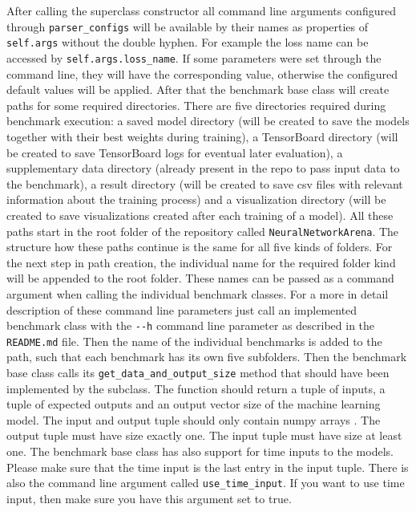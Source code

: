 \documentclass[draft,final]{vutinfth} %
\begin{document}
    After calling the superclass constructor all command line arguments configured through \texttt{parser\_configs} will be available by their names as properties of \texttt{self.args} without the double hyphen.
    For example the loss name can be accessed by \texttt{self.args.loss\_name}.
    If some parameters were set through the command line, they will have the corresponding value, otherwise the configured default values will be applied.
    After that the benchmark base class will create paths for some required directories. 
    There are five directories required during benchmark execution: a saved model directory (will be created to save the models together with their best weights during training), a TensorBoard directory (will be created to save TensorBoard logs for eventual later evaluation), a supplementary data directory (already present in the repo to pass input data to the benchmark), a result directory (will be created to save csv files with relevant information about the training process) and a visualization directory (will be created to save visualizations created after each training of a model).
    All these paths start in the root folder of the repository called \texttt{NeuralNetworkArena}. 
    The structure how these paths continue is the same for all five kinds of folders.
    For the next step in path creation, the individual name for the required folder kind will be appended to the root folder.
    These names can be passed as a command argument when calling the individual benchmark classes. 
    For a more in detail description of these command line parameters just call an implemented benchmark class with the \texttt{-{}-h} command line parameter as described in the \texttt{README.md} file.
    Then the name of the individual benchmarks is added to the path, such that each benchmark has its own five subfolders.
    Then the benchmark base class calls its \texttt{get\_data\_and\_output\_size} method that should have been implemented by the subclass.
    The function should return a tuple of inputs, a tuple of expected outputs and an output vector size of the machine learning model.
    The input and output tuple should only contain numpy arrays \cite{numpy}. The output tuple must have size exactly one.
    The input tuple must have size at least one.
    The benchmark base class has also support for time inputs to the models.
    Please make sure that the time input is the last entry in the input tuple.
    There is also the command line argument called \texttt{use\_time\_input}. 
    If you want to use time input, then make sure you have this argument set to true.
\end{document}
